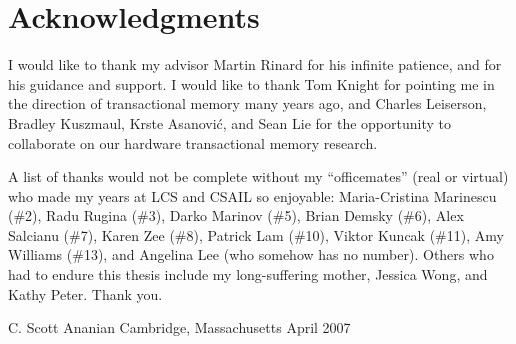 \clearpage
\section*{Acknowledgments}

I would like to thank my advisor Martin Rinard for his infinite
patience, and for his guidance and support.  I would like to thank Tom
Knight for pointing me in the direction of transactional memory many
years ago, and Charles Leiserson, Bradley Kuszmaul, Krste Asanovi\'c,
and Sean Lie for the opportunity to collaborate on our
hardware transactional memory research.

A list of thanks would not be complete without
my ``officemates'' (real or virtual) who made my
years at LCS and CSAIL so enjoyable: Maria-Cristina Marinescu (\#2),
Radu Rugina (\#3), Darko Marinov (\#5), Brian Demsky (\#6), Alex
Salcianu (\#7), Karen Zee (\#8), Patrick Lam (\#10), Viktor Kuncak (\#11), 
Amy Williams (\#13), and Angelina Lee (who somehow has no number).
Others who had to endure this thesis include my long-suffering mother,
Jessica Wong, and Kathy Peter.  Thank you.

\begin{flushright}
C. Scott Ananian\tight
Cambridge, Massachusetts\tight
April 2007
\end{flushright}

